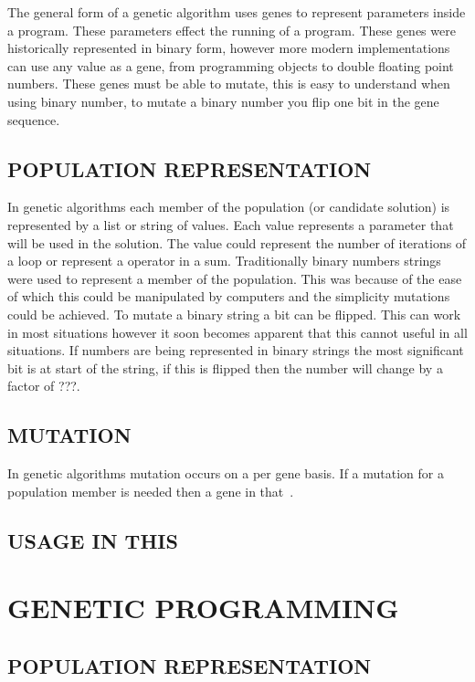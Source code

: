 \documentclass[10pt,twocolumn]{article}
\begin{document}
The general form of a genetic algorithm uses genes to represent parameters inside a program.
These parameters effect the running of a program.
These genes were historically represented in binary form, however more modern implementations can use any value as a gene, from programming objects to double floating point numbers.
These genes must be able to mutate, this is easy to understand when using binary number, to mutate a binary number you flip one bit in the gene sequence. 

\subsection{POPULATION REPRESENTATION}
In genetic algorithms each member of the population (or candidate solution) is represented by a list or string of values.
Each value represents a parameter that will be used in the solution.
The value could represent the number of iterations of a loop or represent a operator in a sum.
Traditionally binary numbers strings were used to represent a member of the population.
This was because of the ease of which this could be manipulated by computers and the simplicity mutations could be achieved.
To mutate a binary string a bit can be flipped.
This can work in most situations however it soon becomes apparent that this cannot useful in all situations.
If numbers are being represented in binary strings the most significant bit is at start of the string, if this is flipped then the number will change by a factor of ???.


\subsection{MUTATION}
In genetic algorithms mutation occurs on a per gene basis. If a mutation for a population member is needed then a gene in that~\cite{j1}. 

\subsection{USAGE IN THIS}

\section{GENETIC PROGRAMMING}

\subsection{POPULATION REPRESENTATION}
\end{document}
